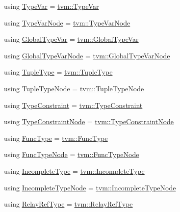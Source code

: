 \begin{DoxyCompactItemize}
using \hyperlink{namespacetvm_1_1relay_a63321eb51080f3f57dd7563a3ca0bfa6}{Type\+Var} = \hyperlink{classtvm_1_1TypeVar}{tvm\+::\+Type\+Var}
\item 
using \hyperlink{namespacetvm_1_1relay_ab2cbe31b81ebd71ea8028a8404a7c9f3}{Type\+Var\+Node} = \hyperlink{classtvm_1_1TypeVarNode}{tvm\+::\+Type\+Var\+Node}
\item 
using \hyperlink{namespacetvm_1_1relay_a2235e350f9cd1eac3aa0177034976043}{Global\+Type\+Var} = \hyperlink{classtvm_1_1GlobalTypeVar}{tvm\+::\+Global\+Type\+Var}
\item 
using \hyperlink{namespacetvm_1_1relay_a9a10e2305e3a50dd00e07b043b93b5e8}{Global\+Type\+Var\+Node} = \hyperlink{classtvm_1_1GlobalTypeVarNode}{tvm\+::\+Global\+Type\+Var\+Node}
\item 
using \hyperlink{namespacetvm_1_1relay_ace9102638dffea6747ae9fa9be9f00f2}{Tuple\+Type} = \hyperlink{classtvm_1_1TupleType}{tvm\+::\+Tuple\+Type}
\item 
using \hyperlink{namespacetvm_1_1relay_a916609c894ac1000b66f9582f338d965}{Tuple\+Type\+Node} = \hyperlink{classtvm_1_1TupleTypeNode}{tvm\+::\+Tuple\+Type\+Node}
\item 
using \hyperlink{namespacetvm_1_1relay_a64e2e93fe04716efd8334ab4e39c92ce}{Type\+Constraint} = \hyperlink{classtvm_1_1TypeConstraint}{tvm\+::\+Type\+Constraint}
\item 
using \hyperlink{namespacetvm_1_1relay_a565e027589acded20ca38df22be098dc}{Type\+Constraint\+Node} = \hyperlink{classtvm_1_1TypeConstraintNode}{tvm\+::\+Type\+Constraint\+Node}
\item 
using \hyperlink{namespacetvm_1_1relay_aa475de90506d48a1bb04ef6d1bd99bfb}{Func\+Type} = \hyperlink{classtvm_1_1FuncType}{tvm\+::\+Func\+Type}
\item 
using \hyperlink{namespacetvm_1_1relay_ab551714015417af28d5ca2b47722997e}{Func\+Type\+Node} = \hyperlink{classtvm_1_1FuncTypeNode}{tvm\+::\+Func\+Type\+Node}
\item 
using \hyperlink{namespacetvm_1_1relay_a34535a1f05224c26db569bc134de7647}{Incomplete\+Type} = \hyperlink{classtvm_1_1IncompleteType}{tvm\+::\+Incomplete\+Type}
\item 
using \hyperlink{namespacetvm_1_1relay_a517ebee34b82bdb80f74ffcdcf361940}{Incomplete\+Type\+Node} = \hyperlink{classtvm_1_1IncompleteTypeNode}{tvm\+::\+Incomplete\+Type\+Node}
\item 
using \hyperlink{namespacetvm_1_1relay_a13fd39dbc2a639262858e9b72e8fb37f}{Relay\+Ref\+Type} = \hyperlink{classtvm_1_1RelayRefType}{tvm\+::\+Relay\+Ref\+Type}

\end{DoxyCompactItemize}
